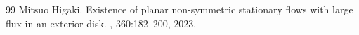 \documentclass[10pt,a4paper]{amsart}
\begin{document}
\begin{thebibliography}{99}
 Mitsuo Higaki. \newblock Existence of planar non-symmetric stationary flows with large flux in an exterior disk. , 360:182--200, 2023.
\end{thebibliography}
\end{document}
